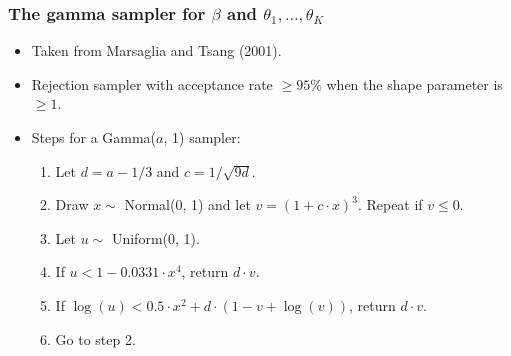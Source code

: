 \documentclass[handout]{beamer}
\numberwithin{equation}{section}
\begin{document}
\begin{frame}
\frametitle{The gamma sampler for $\beta$ and $\theta_1, \ldots, \theta_K$}
\begin{itemize} \small
\item Taken from Marsaglia and Tsang (2001).
\pause \item Rejection sampler with acceptance rate $\ge 95\%$ when the shape parameter is $\ge 1$.
\pause \item Steps for a Gamma($a$, 1) sampler:
\begin{enumerate} \small
\pause \item Let $d = a - 1/3$ and $c = 1 / \sqrt{9 d}$.
\pause \item Draw $x \sim $ Normal(0, 1) and let $v = (1 + c \cdot x)^3$. Repeat if $v \le 0$.
\pause \item Let $u \sim $ Uniform(0, 1).
\pause \item If $u < 1 - 0.0331 \cdot x^4$, return $d \cdot v$.
\pause \item If $\log(u) < 0.5 \cdot x^2 + d \cdot (1 - v + \log(v))$, return $d \cdot v$.
\pause \item Go to step 2.
\end{enumerate}
\end{itemize}
\end{frame}
\end{document}
